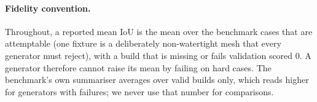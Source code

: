 \paragraph{Fidelity convention.} Throughout, a reported mean IoU is the mean over the \nAttempted{} benchmark cases
that are attemptable (one fixture is a deliberately non-watertight mesh that every generator must reject), with a
build that is missing or fails validation scored 0. A generator therefore cannot raise its mean by failing on hard
cases. The benchmark's own summariser averages over valid builds only, which reads higher for generators with
failures; we never use that number for comparisons.
